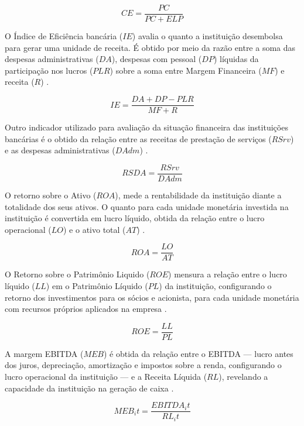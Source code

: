 \documentclass[
  12pt,
  12pt,
  openright,
  oneside,
  a4paper,
  chapter=TITLE,
  section=TITLE,
  subsection=TITLE,
  subsubsection=TITLE,
  english,
  portugues,
  sumario=tradicional]{abntex2}
\begin{document}
\begin{equation}
CE = \frac{PC}{PC + ELP}
\end{equation}

O Índice de Eficiência bancária (\(IE\)) avalia o quanto a instituição desembolsa para gerar uma unidade de receita. É obtido por meio da razão entre a soma das despesas administrativas (\(DA\)), despesas com pessoal (\(DP\)) líquidas da participação nos lucros (\(PLR\)) sobre a soma entre Margem Financeira (\(MF\)) e receita (\(R\)) \cite{timotio:2018}.

\begin{equation}
IE = \frac{DA + DP - PLR}{MF + R} 
\end{equation}

Outro indicador utilizado para avaliação da situação financeira das instituições bancárias é o obtido da relação entre as receitas de prestação de serviços (\(RSrv\)) e as despesas administrativas (\(DAdm\)) \cite{dantas:2012}.

\begin{equation}
RSDA = \frac{RSrv_{}}{DAdm{}}
\end{equation}

O retorno sobre o Ativo (\(ROA\)), mede a rentabilidade da instituição diante a totalidade dos seus ativos. O quanto para cada unidade monetária investida na instituição é convertida em lucro líquido, obtida da relação entre o lucro operacional (\(LO\)) e o ativo total (\(AT\)) \cite{assaf:2020}.

\begin{equation}
ROA = \frac{LO}{AT}
\end{equation}

O Retorno sobre o Patrimônio Liquido (\(ROE\)) mensura a relação entre o lucro líquido (\(LL\)) em o Patrimônio Líquido (\(PL\)) da instituição, configurando o retorno dos investimentos para os sócios e acionista, para cada unidade monetária com recursos próprios aplicados na empresa \cite{assaf:2020}.

\begin{equation}
ROE = \frac{LL}{PL}
\end{equation}

A margem EBITDA (\(MEB\)) é obtida da relação entre o EBITDA --- lucro antes dos juros, depreciação, amortização e impostos sobre a renda, configurando o lucro operacional da instituição --- e a Receita Líquida (\(RL\)), revelando a capacidade da instituição na geração de caixa \cite{assaf:2020}.

\begin{equation}
MEB_it = \frac{EBITDA_it}{RL_it}
\end{equation}
\end{document}
